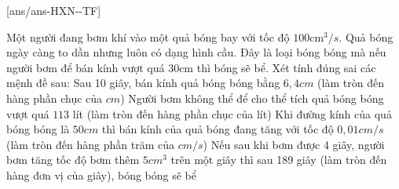 \cauds
{}[ans/ans-HXN-\sode-TF]
\begin{ex}
	Một người đang bơm khí vào một quả bóng bay với tốc độ $100 $cm$^3/s$. Quả bóng ngày càng to dần nhưng luôn có dạng hình cầu. Đây là loại bóng bóng mà nếu người bơm để bán kính vượt quá $30$cm thì bóng sẽ bể.
	Xét tính đúng sai các mệnh đề sau:
	\choiceTF
	{Sau 10 giây, bán kính quả bóng bóng bằng $6,4 cm$ (làm tròn đến hàng phần chục của $cm$)}
	{\True Người bơm không thể để cho thể tích quả bóng bóng vượt quá $113$ lít (làm tròn đến hàng phần chục của lít)}
	{\True Khi đường kính của quả bóng bóng là $50 cm$ thì bán kính của quả bóng đang tăng với tốc độ $0,01 cm/s$ (làm tròn đến hàng phần trăm của $cm/s$)}
	{Nếu sau khi bơm được 4 giây, người bơm tăng tốc độ bơm thêm $5 cm^3$ trên một giây thì sau 189 giây (làm tròn đến hàng đơn vị của giây), bóng bóng sẽ bể}
\end{ex}
